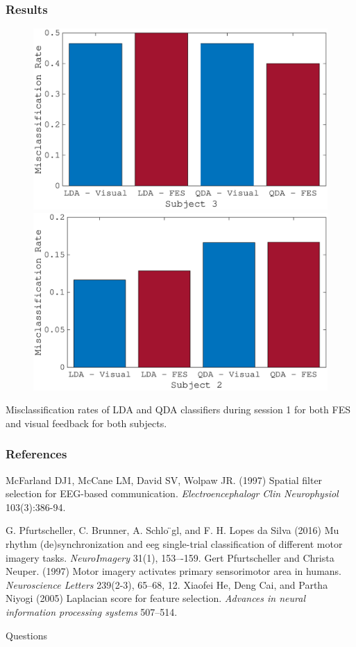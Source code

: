 \documentclass{beamer}
\begin{document}
\begin{frame}%
	\frametitle{Results}
	\begin{figure}
		\includegraphics[width=0.50\linewidth]{fig/clasi.eps}
		\includegraphics[width=0.50\linewidth]{fig/clasi2.eps}
	\end{figure}
	Misclassification rates of LDA and QDA classifiers during session 1 for both FES and visual feedback for both subjects.
\end{frame}
\begin{frame}
\frametitle{References}
\footnotesize{
\begin{thebibliography}{99} %
 McFarland DJ1, McCane LM, David SV, Wolpaw JR. (1997)
\newblock Spatial filter selection for EEG-based communication.
\newblock \emph{Electroencephalogr Clin Neurophysiol} 103(3):386-94.


 G. Pfurtscheller, C. Brunner, A. Schlo ̈gl, and F. H. Lopes da Silva (2016)
\newblock Mu rhythm (de)synchronization and eeg single-trial classification of different motor imagery tasks.
\newblock \emph{NeuroImagery} 31(1), 153–-159.
 Gert Pfurtscheller and Christa Neuper. (1997)
\newblock Motor imagery activates primary sensorimotor area in humans.
\newblock \emph{Neuroscience Letters} 239(2-3), 65–68, 12.
 Xiaofei He, Deng Cai, and Partha Niyogi (2005)
\newblock  Laplacian score for feature selection.
\newblock \emph{Advances in neural information processing systems} 507–514.
\end{thebibliography}
}
\end{frame}

\begin{frame}
\Huge{\centerline{Questions}}
\end{frame}

\end{document}
